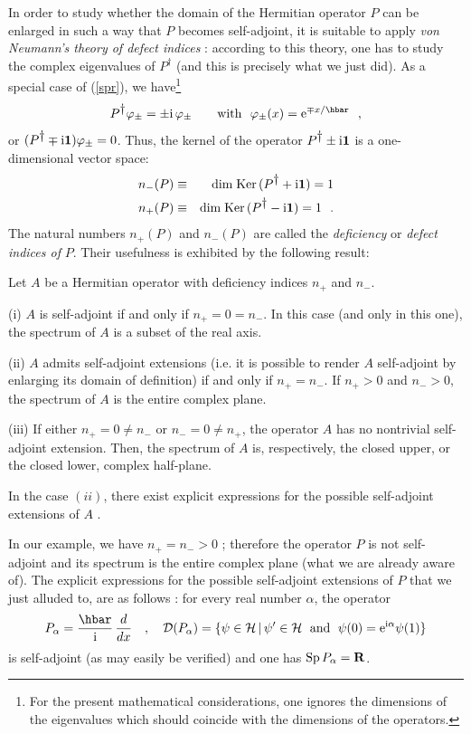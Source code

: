 \documentclass[12pt]{report}
\begin{document}
In order to study whether the domain of the Hermitian 
operator $P$ 
can be enlarged in such a way that $P$ becomes self-adjoint, 
it is suitable to apply {\em von Neumann's theory of 
defect  indices} \cite{rs, sg}: 
according to this theory, 
one has to study the complex eigenvalues of 
$P^{\dag}$ (and this is precisely what we just did). 
As a special case of (\ref{spr}), we have\footnote{For 
the present mathematical considerations, one 
ignores the dimensions of the eigenvalues which should coincide
with the dimensions of the operators.} 
\[
P^{\dag} \varphi_{\pm} = \pm \ri \, \varphi_{\pm}
\qquad {\rm with} \ \ \varphi_{\pm} (x) = {\rm e}^{\mp x / \hbar}
\ \ ,
\]
or  
$(P^{\displaystyle{\dagger}} \mp {\rm i} {\bf 1})  \varphi_{\pm} =0$.
Thus, the kernel of the operator $P^{\displaystyle{\dagger}} \pm {\rm i} {\bf 1}$ 
is a one-dimensional vector space: 
\begin{eqnarray}
\label{defe1}
n_- (P) & \equiv & {\rm dim \; Ker} \,
(P^{\displaystyle{\dagger}} +  {\rm i} {\bf 1}) =1
\nonumber
\\
n_+ (P) & \equiv & {\rm dim \; Ker} \,
(P^{\displaystyle{\dagger}} -  {\rm i} {\bf 1}) = 1
\ \ .
\end{eqnarray}
The natural numbers 
$n_+ (P)$ and 
$n_- (P)$ are called the {\em deficiency} or {\em defect indices of} $P$. 
Their usefulness is exhibited by the following result:
\begin{theo}
Let $A$ be a Hermitian operator with deficiency indices
$n_+$ and $n_-$. 

\noindent 
{\rm (i)} 
$A$ is self-adjoint if and only if $n_+ = 0= n_-$.
In this case (and only in this one), the spectrum of $A$ is 
a subset of the real axis. 

\noindent 
{\rm (ii)}
$A$ admits self-adjoint extensions (i.e. it is possible to 
render $A$ self-adjoint by enlarging its domain of definition)
if and only if $n_+ =  n_-$.
 If $n_+ >0$ and $n_- >0$, the spectrum of $A$ is the entire 
 complex plane. 

\noindent 
{\rm (iii)} 
If either $n_+ =0 \neq n_-$ or $n_- =0 \neq  n_+$,
the operator $A$ has no nontrivial self-adjoint extension.
Then, the spectrum of $A$ is, respectively, 
the closed upper, or the closed lower, complex half-plane.
\end{theo}
In the case $(ii)$, there exist explicit expressions 
for the possible self-adjoint extensions of $A$ \cite{rs}. 

In our example, we have $n_+ =  n_- >0$ ; therefore the operator $P$ 
is not
self-adjoint and its spectrum is the entire complex plane 
(what we are already aware of). 
The explicit expressions for the possible 
self-adjoint extensions of $P$ that we just 
alluded to,  are as follows \cite{rs}: 
for every real number  $\alpha$, the operator  
\begin{equation}
\label{alpha}
P_{\alpha} = \ds{\hbar \over \ri} \, \ds{d \over dx} \quad , \quad
{\cal D} (P_{\alpha}) = \{ \psi \in \hs \, | \,
\psi^{\prime} \in \hs \ \; {\rm and} \ \; \psi(0) =
{\rm e}^{\ri \alpha} \psi(1) \}
\end{equation}
is self-adjoint (as may easily be verified) 
and one has 
${\rm Sp} \, P_{\alpha} = {\bf R}$.
\end{document}
